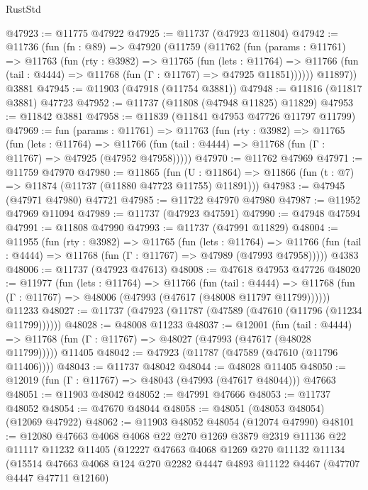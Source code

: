 \begin{lexlean}{RustStd}
\begin{coremodule}
@47923 := @11775 @47922
@47925 := @11737 (@47923 @11804)
@47942 := @11736
    (fun (fn : @89) =>
    @47920
      (@11759
        (@11762
          (fun (params : @11761) =>
          @11763
            (fun (rty : @3982) =>
            @11765
              (fun (lets : @11764) =>
              @11766 (fun (tail : @4444) => @11768 (fun (Γ : @11767) => @47925 @11851))))))
        @11897))
    @3881
@47945 := @11903 (@47918 (@11754 @3881))
@47948 := @11816 (@11817 @3881) @47723
@47952 := @11737 (@11808 (@47948 @11825) @11829)
@47953 := @11842 @3881
@47958 := @11839 (@11841 @47953 @47726 @11797 @11799)
@47969 := fun (params : @11761) =>
  @11763
    (fun (rty : @3982) =>
    @11765
      (fun (lets : @11764) =>
      @11766 (fun (tail : @4444) => @11768 (fun (Γ : @11767) => @47925 (@47952 @47958)))))
@47970 := @11762 @47969
@47971 := @11759 @47970
@47980 := @11865
    (fun (U : @11864) => @11866 (fun (t : @7) => @11874 (@11737 (@11880 @47723 @11755) @11891)))
@47983 := @47945 (@47971 @47980) @47721
@47985 := @11722 @47970 @47980
@47987 := @11952 @47969 @11094
@47989 := @11737 (@47923 @47591)
@47990 := @47948 @47594
@47991 := @11808 @47990
@47993 := @11737 (@47991 @11829)
@48004 := @11955
    (fun (rty : @3982) =>
    @11765
      (fun (lets : @11764) =>
      @11766 (fun (tail : @4444) => @11768 (fun (Γ : @11767) => @47989 (@47993 @47958)))))
    @4383
@48006 := @11737 (@47923 @47613)
@48008 := @47618 @47953 @47726
@48020 := @11977
    (fun (lets : @11764) =>
    @11766
      (fun (tail : @4444) =>
      @11768 (fun (Γ : @11767) => @48006 (@47993 (@47617 (@48008 @11797 @11799))))))
    @11233
@48027 := @11737 (@47923 (@11787 (@47589 (@47610 (@11796 (@11234 @11799))))))
@48028 := @48008 @11233
@48037 := @12001
    (fun (tail : @4444) => @11768 (fun (Γ : @11767) => @48027 (@47993 (@47617 (@48028 @11799)))))
    @11405
@48042 := @47923 (@11787 (@47589 (@47610 (@11796 @11406))))
@48043 := @11737 @48042
@48044 := @48028 @11405
@48050 := @12019 (fun (Γ : @11767) => @48043 (@47993 (@47617 @48044))) @47663
@48051 := @11903 @48042
@48052 := @47991 @47666
@48053 := @11737 @48052
@48054 := @47670 @48044
@48058 := @48051 (@48053 @48054) (@12069 @47922)
@48062 := @11903 @48052 @48054 (@12074 @47990)
@48101 := @12080
    @47663
    @4068
    @4068
    @22
    @270
    @1269
    @3879
    @2319
    @11136
    @22
    @11117
    @11232
    @11405
    (@12227
      @47663
      @4068
      @1269
      @270
      @11132
      @11134
      (@15514
        @47663
        @4068
        @124
        @270
        @2282
        @4447
        @4893
        @11122
        @4467
        (@47707 @4447 @47711 @12160)

\end{coremodule}
\end{lexlean}
